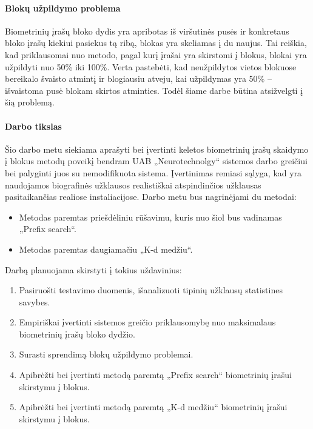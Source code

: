 \paragraph{Blokų užpildymo problema}

Biometrinių įrašų bloko dydis yra apribotas iš viršutinės pusės ir konkretaus bloko įrašų kiekiui pasiekus tą ribą, blokas yra skeliamas į du naujus.
Tai reiškia, kad priklausomai nuo metodo, pagal kurį įrašai yra skirstomi į blokus, blokai yra užpildyti nuo 50\% iki 100\%.
Verta pastebėti, kad neužpildytos vietos blokuose bereikalo švaisto atmintį ir blogiausiu atveju, kai užpildymas yra 50\% -- išvaistoma pusė blokam skirtos atminties.
Todėl šiame darbe būtina atsižvelgti į šią problemą.

\paragraph{Darbo tikslas}

Šio darbo metu siekiama aprašyti bei įvertinti keletos biometrinių įrašų skaidymo į blokus metodų poveikį bendram UAB „Neurotechnolgy“ sistemos darbo greičiui bei palyginti juos su nemodifikuota sistema.
Įvertinimas remiasi sąlyga, kad yra naudojamos biografinės užklausos realistiškai atspindinčios užklausas pasitaikančias realiose instaliacijose.
Darbo metu bus nagrinėjami du metodai:
\begin{itemize}
		\item Metodas paremtas priešdėliniu rūšavimu, kuris nuo šiol bus vadinamas „Prefix search“.
		\item Metodas paremtas daugiamačiu „K-d medžiu“.
\end{itemize}

Darbą planuojama skirstyti į tokius uždavinius:

\begin{enumerate}
	\item Pasiruošti testavimo duomenis, išanalizuoti tipinių užklausų statistines savybes.
	\item Empiriškai įvertinti sistemos greičio priklausomybę nuo maksimalaus biometrinių įrašų bloko dydžio.
	\item Surasti sprendimą blokų užpildymo problemai.
	\item Apibrėžti bei įvertinti metodą paremtą „Prefix search“ biometrinių įrašui skirstymu į blokus.
	\item Apibrėžti bei įvertinti metodą paremtą „K-d medžiu“ biometrinių įrašui skirstymu į blokus.
\end{enumerate}

